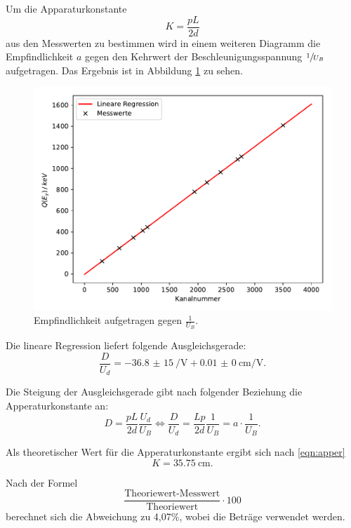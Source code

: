 Um die Apparaturkonstante
\begin{equation}
  K=\frac{pL}{2d}
  \label{eqn:apper}
\end{equation}
aus den Messwerten zu bestimmen wird in einem weiteren Diagramm die Empfindlichkeit $a$
gegen den Kehrwert der Beschleunigungsspannung $\sfrac{1}{U_B}$ aufgetragen. Das Ergebnis
ist in Abbildung \ref{fig:plot3} zu sehen.

\begin{figure}
  \centering
  \includegraphics{plot3.pdf}
  \caption{Empfindlichkeit aufgetragen gegen $\frac{1}{U_B}$.}
  \label{fig:plot3}
\end{figure}

Die lineare Regression liefert folgende Ausgleichsgerade:
\begin{equation}
  \frac{D}{U_d}=\SI{-36,8(15)}{\per\V}+\SI{0,01(0)}{\cm\per\V}.
  \label{eqn:ausgleich}
\end{equation}

Die Steigung der Ausgleichsgerade gibt nach folgender Beziehung die Apperaturkonstante an:
\begin{equation}
  D=\frac{pL}{2d}\frac{U_d}{U_B} \iff \frac{D}{U_d}=\frac{Lp}{2d}\frac{1}{U_B}=a\cdot\frac{1}{U_B}.
\end{equation}

Als theoretischer Wert für die Apperaturkonstante ergibt sich nach \ref{eqn:apper}
\begin{equation}
  K=\SI{35,75}{\cm}.
\end{equation}

Nach der Formel
\begin{equation}
  \frac{\text{Theoriewert-Messwert}}{\text{Theoriewert}}\cdot 100
\end{equation}
berechnet sich die Abweichung zu 4,07\%, wobei die Beträge verwendet werden.


